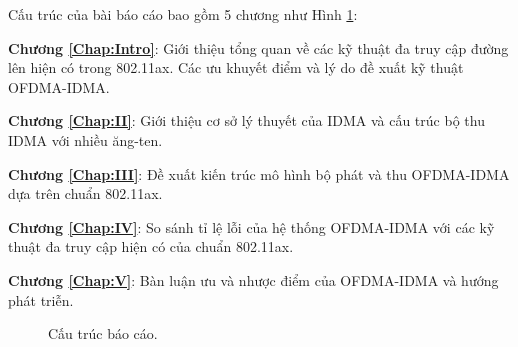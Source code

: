 Cấu trúc của bài báo cáo bao gồm 5 chương như Hình \ref{fig:Struc}:

\textbf{Chương \ref{Chap:Intro}}: Giới thiệu tổng quan về các kỹ thuật đa truy cập đường lên hiện có trong 802.11ax. Các ưu khuyết điểm và lý do đề xuất kỹ thuật OFDMA-IDMA.

\textbf{Chương \ref{Chap:II}}: Giới thiệu cơ sở lý thuyết của IDMA và cấu trúc bộ thu IDMA với nhiều ăng-ten. 

\textbf{Chương \ref{Chap:III}}: Đề xuất kiến trúc mô hình bộ phát và thu OFDMA-IDMA dựa trên chuẩn 802.11ax. 

\textbf{Chương \ref{Chap:IV}}: So sánh tỉ lệ lỗi của hệ thống OFDMA-IDMA với các kỹ thuật đa truy cập hiện có của chuẩn 802.11ax. 

\textbf{Chương \ref{Chap:V}}: Bàn luận ưu và nhược điểm của OFDMA-IDMA và hướng phát triễn. 

\begin{figure}[H]
    \centering
    
    \caption{Cấu trúc báo cáo.}
    \label{fig:Struc}
\end{figure}

